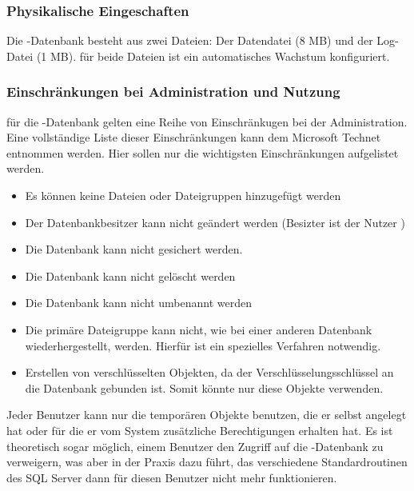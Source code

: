         \subsubsection{Physikalische Eingeschaften}
          Die -Datenbank besteht aus zwei Dateien: Der
          Datendatei  (8 MB) und der Log-Datei
           (1 MB). f\"ur beide Dateien ist ein
          automatisches Wachstum konfiguriert.
        \subsubsection{Einschränkungen bei Administration und Nutzung}
          f\"ur die -Datenbank gelten eine Reihe von
          Einschränkugen bei der Administration. Eine vollständige Liste dieser
          Einschränkungen kann dem Microsoft Technet entnommen werden. Hier
          sollen nur die wichtigsten Einschränkungen aufgelistet werden.
          \begin{itemize}
            \item Es können keine Dateien oder Dateigruppen hinzugefügt werden
            \item Der Datenbankbesitzer kann nicht geändert werden (Besizter
            ist der Nutzer )
            \item Die Datenbank kann nicht gesichert werden.
            \item Die Datenbank kann nicht gelöscht werden
            \item Die Datenbank kann nicht umbenannt werden
            \item Die primäre Dateigruppe kann nicht, wie bei einer anderen
            Datenbank wiederhergestellt, werden. Hierf\"ur ist ein spezielles
            Verfahren notwendig.
            \item Erstellen von verschlüsselten Objekten, da der
            Verschlüsselungsschlüssel an die Datenbank gebunden ist. Somit
            könnte nur  diese Objekte verwenden.
          \end{itemize}
          Jeder Benutzer kann nur die temporären Objekte benutzen, die er selbst
          angelegt hat oder f\"ur die er vom System zusätzliche Berechtigungen
          erhalten hat. Es ist theoretisch sogar möglich, einem Benutzer den
          Zugriff auf die -Datenbank zu verweigern, was aber
          in der Praxis dazu führt, das verschiedene Standardroutinen des SQL
          Server dann f\"ur diesen Benutzer nicht mehr funktionieren.
          \begin{literaturinternet}
            \item \cite{ms190768}
          \end{literaturinternet}          
